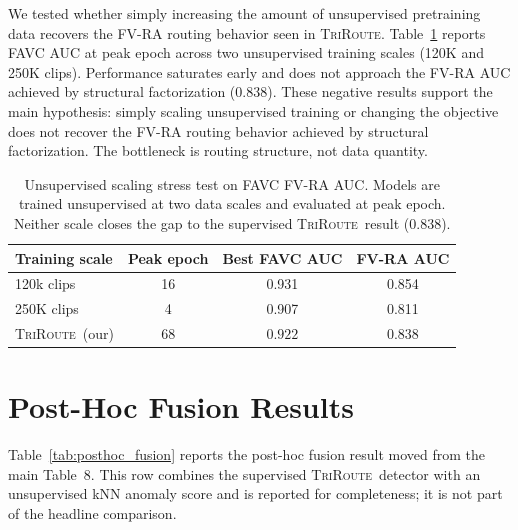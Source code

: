 \documentclass{article}
\newcommand{\method}{\textsc{TriRoute}}
\begin{document}
We tested whether simply increasing the amount of unsupervised pretraining data recovers the FV-RA routing behavior seen in \method. Table~\ref{tab:scaling_stress} reports FAVC AUC at peak epoch across two unsupervised training scales (120K and 250K clips). Performance saturates early and does not approach the FV-RA AUC achieved by structural factorization ($0.838$). These negative results support the main hypothesis: simply scaling unsupervised training or changing the objective does not recover the FV-RA routing behavior achieved by structural factorization. The bottleneck is routing structure, not data quantity.

\begin{table}[h]
    \centering
    \caption{Unsupervised scaling stress test on FAVC FV-RA AUC. Models are trained unsupervised at two data scales and evaluated at peak epoch. Neither scale closes the gap to the supervised \method\ result ($0.838$).}
    \label{tab:scaling_stress}
    \small
    \begin{tabular}{lccc}
        \toprule
        Training scale & Peak epoch & Best FAVC AUC & FV-RA AUC \\
        \midrule
        120k clips  & 16 & 0.931 & 0.854 \\
        250K clips  & 4 & 0.907 & 0.811 \\
        \midrule
        \method\ (our) & 68 & $0.922$ & $0.838$ \\
        \bottomrule
    \end{tabular}
    \vspace{0.5em}
\end{table}

\section{Post-Hoc Fusion Results}
\label{app:posthoc_fusion}

Table~\ref{tab:posthoc_fusion} reports the post-hoc fusion result moved from the main Table~8. This row combines the supervised \method\ detector with an unsupervised kNN anomaly score and is reported for completeness; it is not part of the headline comparison.
\end{document}
